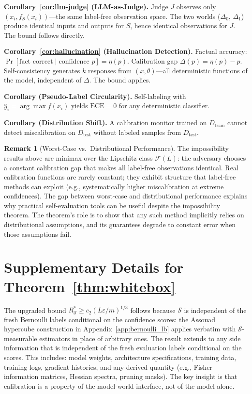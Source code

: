 \documentclass{article}
\newcommand{\ECE}{\mathrm{ECE}}
\newcommand{\cF}{\mathcal{F}}
\newcommand{\cS}{\mathcal{S}}
\newcommand{\Lip}{L}
\newcommand{\errrate}{\varepsilon}
\newcommand{\nsamples}{m}
\newcommand{\calmapraw}{\eta}
\newcommand{\calmap}{\Delta}
\theoremstyle{definition}
\newtheorem{remark}[theorem]{Remark}
\begin{document}
\textbf{Corollary~\ref{cor:llm-judge} (LLM-as-Judge).} Judge $J$ observes only $(x_i, f_S(x_i))$---the same label-free observation space. The two worlds ($\calmap_0$, $\calmap_1$) produce identical inputs and outputs for $S$, hence identical observations for $J$. The bound follows directly.

\textbf{Corollary~\ref{cor:hallucination} (Hallucination Detection).} Factual accuracy: $\Pr[\text{fact correct} \mid \text{confidence } p] = \calmapraw(p)$. Calibration gap $\calmap(p) = \calmapraw(p) - p$. Self-consistency generates $k$ responses from $(x, \theta)$---all deterministic functions of the model, independent of $\calmap$. The bound applies.

\textbf{Corollary (Pseudo-Label Circularity).} Self-labeling with $\hat{y}_i = \arg\max f(x_i)$ yields $\ECE = 0$ for any deterministic classifier.

\textbf{Corollary (Distribution Shift).} A calibration monitor trained on $D_{\mathrm{train}}$ cannot detect miscalibration on $D_{\mathrm{test}}$ without labeled samples from $D_{\mathrm{test}}$.

\begin{remark}[Worst-Case vs.\ Distributional Performance]
The impossibility results above are minimax over the Lipschitz class $\cF(\Lip)$: the adversary chooses a constant calibration gap that makes all label-free observations identical. Real calibration functions are rarely constant; they exhibit structure that label-free methods can exploit (e.g., systematically higher miscalibration at extreme confidences). The gap between worst-case and distributional performance explains why practical self-evaluation tools can be useful despite the impossibility theorem. The theorem's role is to show that any such method implicitly relies on distributional assumptions, and its guarantees degrade to constant error when those assumptions fail.
\end{remark}

\section{Supplementary Details for Theorem~\ref{thm:whitebox}}
\label{app:whitebox}

The upgraded bound $R^*_\cS \geq c_2(\Lip\errrate/\nsamples)^{1/3}$ follows because $\cS$ is independent of the fresh Bernoulli labels conditional on the confidence scores: the Assouad hypercube construction in Appendix~\ref{app:bernoulli_lb} applies verbatim with $\cS$-measurable estimators in place of arbitrary ones. The result extends to any side information that is independent of the fresh evaluation labels conditional on the scores. This includes: model weights, architecture specifications, training data, training logs, gradient histories, and any derived quantity (e.g., Fisher information matrices, Hessian spectra, pruning masks). The key insight is that calibration is a property of the model-world interface, not of the model alone.
\end{document}
